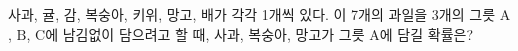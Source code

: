 사과, 귤, 감, 복숭아, 키위, 망고, 배가 각각 1개씩 있다. 이 7개의 과일을 3개의 그릇 $\mathrm{A}$, $\mathrm{B}$, $\mathrm{C}$에 남김없이 담으려고 할 때, 사과, 복숭아, 망고가 그릇 $\mathrm{A}$에 담길 확률은? 
